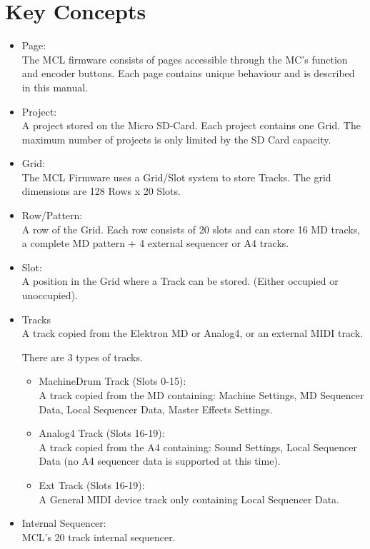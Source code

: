 \chapter{Key Concepts}

\begin{itemize}
\item Page:
\\
The MCL firmware consists of pages accessible through the MC's function and encoder buttons. Each page contains unique behaviour and is described in this manual.
\item Project:
\\
A project stored on the Micro SD-Card. Each project contains one Grid. 
The maximum number of projects is only limited by the SD Card capacity.

\item Grid:
\\
The MCL Firmware uses a Grid/Slot system to store Tracks. 
The grid dimensions are 128 Rows x 20 Slots. 

\item Row/Pattern:
\\
A row of the Grid. Each row consists of 20 slots and can store 16 MD tracks, a complete MD pattern + 4 external sequencer or A4 tracks.

\item Slot:
\\
A position in the Grid where a Track can be stored. (Either occupied or unoccupied).

\item Tracks
\\
A track copied from the Elektron MD or Analog4, or an external MIDI track.

There are 3 types of tracks.
\begin{itemize}

\item MachineDrum Track (Slots 0-15):\\
A track copied from the MD containing: Machine Settings, MD Sequencer Data, Local Sequencer Data, Master Effects Settings.
\\
\item Analog4 Track (Slots 16-19):\\

A track copied from the A4 containing: Sound Settings, Local Sequencer Data (no A4 sequencer data is supported at this time).
\\
\item Ext Track (Slots 16-19):\\

A General MIDI device track only containing Local Sequencer Data.
\\
\end{itemize}

\item Internal Sequencer:\\
MCL's 20 track internal sequencer.

\end{itemize}


